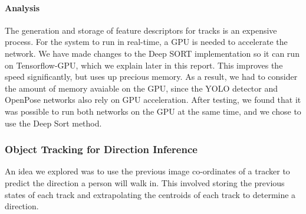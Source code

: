 \paragraph{Analysis} The generation and storage of feature descriptors for tracks is an expensive process. For the system to run in real-time, a GPU is needed to accelerate the network. We have made changes to the Deep SORT implementation so it can run on Tensorflow-GPU, which we explain later in this report. This improves the speed significantly, but uses up precious memory. As a result, we had to consider the amount of memory avaiable on the GPU, since the YOLO detector and OpenPose networks also rely on GPU acceleration. After testing, we found that it was possible to run both networks on the GPU at the same time, and we chose to use the Deep Sort method.

\subsubsection{Object Tracking for Direction Inference} \label{sec:objecTrackingDirection}
An idea we explored was to use the previous image co-ordinates of a tracker to predict the direction a person will walk in. This involved storing the previous states of each track and extrapolating the centroids of each track to determine a direction.

